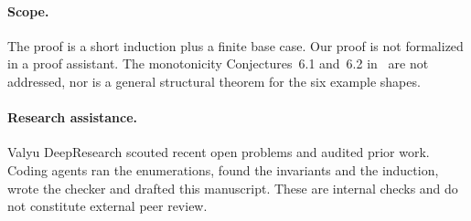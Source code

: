 \documentclass[11pt]{amsart}
\theoremstyle{definition}
\theoremstyle{remark}
\begin{document}
\paragraph{Scope.} The proof is a short induction plus a finite base case. Our proof is not formalized in a proof assistant. The monotonicity Conjectures~6.1 and~6.2 in~\cite[\S6]{DFHLMP2026} are not addressed, nor is a general structural theorem for the six example shapes.

\paragraph{Research assistance.}
Valyu DeepResearch scouted recent open problems and audited prior work. Coding agents ran the enumerations, found the invariants and the induction, wrote the checker and drafted this manuscript. These are internal checks and do not constitute external peer review.



\end{document}
